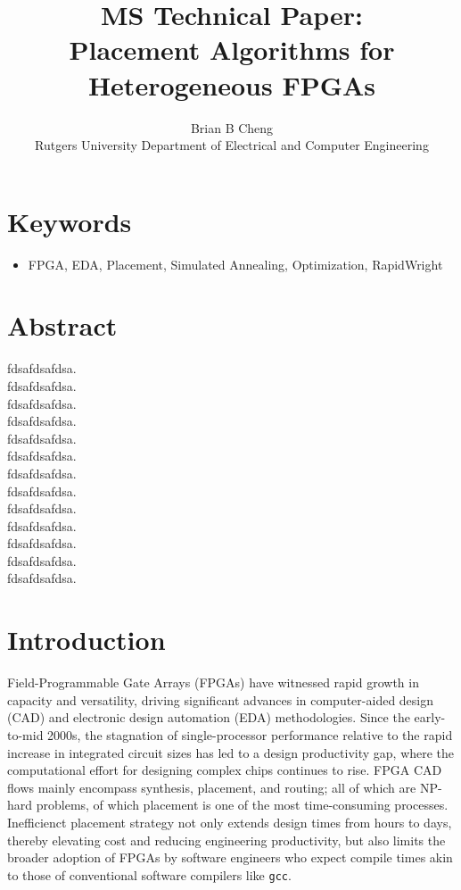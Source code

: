 \documentclass{article}
\begin{document}
\title{MS Technical Paper: \\ Placement Algorithms for Heterogeneous FPGAs}
\author{Brian B Cheng \\ Rutgers University Department of Electrical and Computer Engineering}


\date{}
\maketitle

\begin{multicols}{2}

\section{Keywords}
\begin{itemize}
    \item FPGA, EDA, Placement, Simulated Annealing, Optimization, RapidWright
\end{itemize}


\section{Abstract}
    fdsafdsafdsa. \\ 
    fdsafdsafdsa. \\ 
    fdsafdsafdsa. \\ 
    fdsafdsafdsa. \\ 
    fdsafdsafdsa. \\ 
    fdsafdsafdsa. \\ 
    fdsafdsafdsa. \\ 
    fdsafdsafdsa. \\ 
    fdsafdsafdsa. \\ 
    fdsafdsafdsa. \\ 
    fdsafdsafdsa. \\ 
    fdsafdsafdsa. \\ 
    fdsafdsafdsa. \\ 

\section{Introduction}

    Field-Programmable Gate Arrays (FPGAs) have witnessed rapid growth in capacity and versatility, driving significant advances in computer-aided design (CAD) and electronic design automation (EDA) methodologies. 
    Since the early-to-mid 2000s, the stagnation of single-processor performance relative to the rapid increase in integrated circuit sizes has led to a design productivity gap, where the computational effort for designing complex chips continues to rise. 
    FPGA CAD flows mainly encompass synthesis, placement, and routing; all of which are NP-hard problems, of which placement is one of the most time-consuming processes. 
    Inefficienct placement strategy not only extends design times from hours to days, thereby elevating cost and reducing engineering productivity, but also limits the broader adoption of FPGAs by software engineers who expect compile times akin to those of conventional software compilers like {\tt gcc}. 


\end{multicols}
\end{document}
